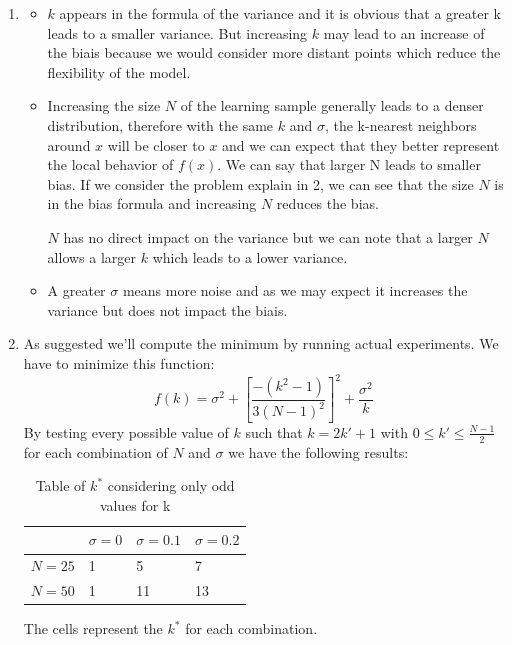 \documentclass[a4paper,10pt]{article}
\begin{document}
\begin{enumerate}
    
    \item 
    \begin{itemize}
        \item 
        $k$ appears in the formula of the variance and it is obvious that a greater k leads to a smaller variance. But increasing $k$ may lead to an increase of the biais because we would consider more distant points which reduce the flexibility of the model.
        \item
        Increasing the size $N$ of the learning sample generally leads to a denser distribution, therefore with the same $k$ and $\sigma$, the k-nearest neighbors around $x$ will be closer to $x$ and we can expect that they better represent the local behavior of $f(x)$.
        We can say that larger N leads to smaller bias. If we consider the problem explain in 2, we can see that the size $N$ is in the bias formula and increasing $N$ reduces the bias.

        $N$ has no direct impact on the variance but we can note that a larger $N$ allows a larger $k$ which leads to a lower variance. 
        \item 
        A greater $\sigma$ means more noise and as we may expect it increases the variance but does not impact the biais.
    \end{itemize}


    
    \item
    As suggested we'll compute the minimum by running actual experiments. We have to minimize this function:
    $$
    f(k) = \sigma^2 + \left[\frac{-(k^2 - 1)}{3(N-1)^2}\right]^2 + \frac{\sigma^2}{k}
    $$
    By testing every possible value of $k$ such that $k = 2k' + 1$ with $0 \le k' \le \frac{N-1}{2}$ for each combination of $N$ and $\sigma$ we have the following results:
    \begin{table}[H]
      \centering
      \begin{tabular}{l|l|l|l|}
      \cline{2-4}
                               & $\sigma = 0$ & $\sigma = 0.1$ & $\sigma = 0.2$ \\ \hline
      \multicolumn{1}{|l|}{$N = 25$} & 1  &  5  &  7 \\ \hline
      \multicolumn{1}{|l|}{$N = 50$} & 1  &  11   &  13 \\ \hline
      \end{tabular}
      \caption{Table of $k^*$ considering only odd values for k}
    \end{table}
    The cells represent the $k^*$ for each combination.


\end{enumerate}
\end{document}
